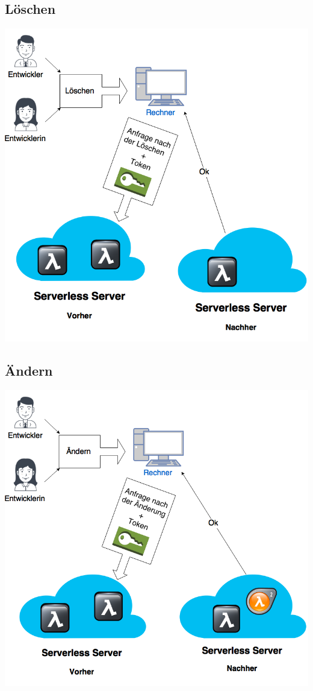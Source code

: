 \documentclass[a4paper,20pt,oneside]{book}
\begin{document}
\subsection{Löschen}
\hspace{1cm}
\begin{center}
\includegraphics[width=16 cm]{Loschen.png}
\end{center}

\pagebreak

\subsection{Ändern}
\hspace{1cm}
\begin{center}
\includegraphics[width=16 cm]{Andern.png} 
\end{center}
\end{document}
